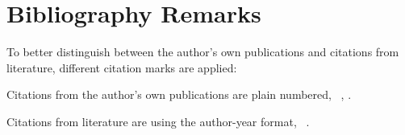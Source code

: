 \section{Bibliography Remarks}
\label{sec:intro:BibRemarks}
To better distinguish between the author's own publications and citations from literature, different citation marks are applied:
\begin{compactitem}
  \item Citations from the author's own publications are plain numbered, \eg~, . 
  \item Citations from literature are using the author-year format, \eg~.
\end{compactitem}



